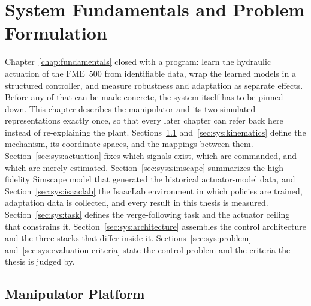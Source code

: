 \chapter{System Fundamentals and Problem Formulation}
\label{chap:system}

Chapter~\ref{chap:fundamentals} closed with a program: learn the
hydraulic actuation of the FME~500 from identifiable data, wrap the
learned models in a structured controller, and measure robustness and
adaptation as separate effects. Before any of that can be made concrete,
the system itself has to be pinned down. This chapter describes the
manipulator and its two simulated representations exactly once, so that
every later chapter can refer back here instead of re-explaining the
plant. Sections~\ref{sec:sys:platform} and~\ref{sec:sys:kinematics}
define the mechanism, its coordinate spaces, and the mappings between
them. Section~\ref{sec:sys:actuation} fixes which signals exist, which
are commanded, and which are merely estimated.
Section~\ref{sec:sys:simscape} summarizes the high-fidelity Simscape
model that generated the historical actuator-model data, and
Section~\ref{sec:sys:isaaclab} the IsaacLab environment in which
policies are trained, adaptation data is collected, and every result in
this thesis is measured. Section~\ref{sec:sys:task} defines the verge-following task and the actuator
ceiling that constrains it. Section~\ref{sec:sys:architecture} assembles the
control architecture and the three stacks that differ inside it.
Sections~\ref{sec:sys:problem} and~\ref{sec:sys:evaluation-criteria} state the
control problem and the criteria the thesis is judged by.

\section{Manipulator Platform}
\label{sec:sys:platform}


